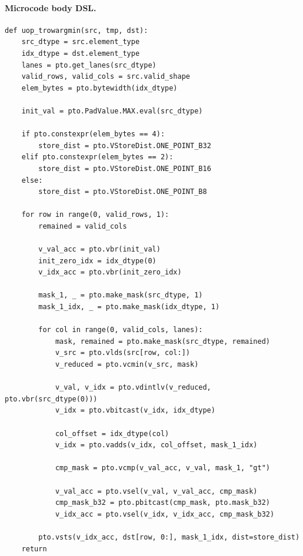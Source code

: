 \paragraph{Microcode body DSL.}
\begin{lstlisting}[style=ptocode]
def uop_trowargmin(src, tmp, dst):
    src_dtype = src.element_type
    idx_dtype = dst.element_type
    lanes = pto.get_lanes(src_dtype)
    valid_rows, valid_cols = src.valid_shape
    elem_bytes = pto.bytewidth(idx_dtype)

    init_val = pto.PadValue.MAX.eval(src_dtype)

    if pto.constexpr(elem_bytes == 4):
        store_dist = pto.VStoreDist.ONE_POINT_B32
    elif pto.constexpr(elem_bytes == 2):
        store_dist = pto.VStoreDist.ONE_POINT_B16
    else:
        store_dist = pto.VStoreDist.ONE_POINT_B8

    for row in range(0, valid_rows, 1):
        remained = valid_cols

        v_val_acc = pto.vbr(init_val)
        init_zero_idx = idx_dtype(0)
        v_idx_acc = pto.vbr(init_zero_idx)

        mask_1, _ = pto.make_mask(src_dtype, 1)
        mask_1_idx, _ = pto.make_mask(idx_dtype, 1)

        for col in range(0, valid_cols, lanes):
            mask, remained = pto.make_mask(src_dtype, remained)
            v_src = pto.vlds(src[row, col:])
            v_reduced = pto.vcmin(v_src, mask)

            v_val, v_idx = pto.vdintlv(v_reduced, pto.vbr(src_dtype(0)))
            v_idx = pto.vbitcast(v_idx, idx_dtype)

            col_offset = idx_dtype(col)
            v_idx = pto.vadds(v_idx, col_offset, mask_1_idx)

            cmp_mask = pto.vcmp(v_val_acc, v_val, mask_1, "gt")

            v_val_acc = pto.vsel(v_val, v_val_acc, cmp_mask)
            cmp_mask_b32 = pto.pbitcast(cmp_mask, pto.mask_b32)
            v_idx_acc = pto.vsel(v_idx, v_idx_acc, cmp_mask_b32)

        pto.vsts(v_idx_acc, dst[row, 0:], mask_1_idx, dist=store_dist)
    return
\end{lstlisting}
\Needspace{0.34\textheight}
